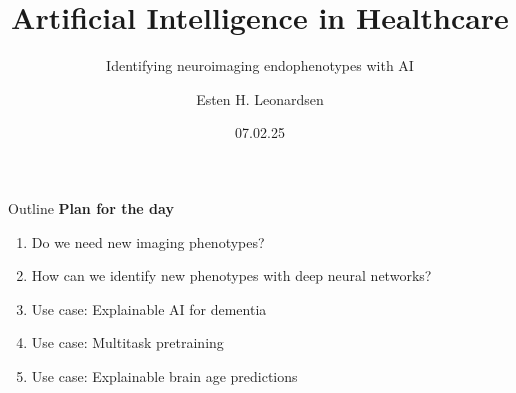 \documentclass[10pt]{beamer}
\title{Artificial Intelligence in Healthcare}
\subtitle{Identifying neuroimaging endophenotypes with AI}
\author{Esten H. Leonardsen}
\date{07.02.25}
\begin{document}
	\begin{frame}
	 	\maketitle
	\end{frame}

    \begin{frame}{Outline}
        \textbf{Plan for the day}
        \begin{enumerate}
            \item Do we need new imaging phenotypes?
            \item How can we identify new phenotypes with deep neural networks?
            \item Use case: Explainable AI for dementia
            \item Use case: Multitask pretraining
            \item Use case: Explainable brain age predictions
        \end{enumerate}
    \end{frame}

    
    
    
    
\end{document}
